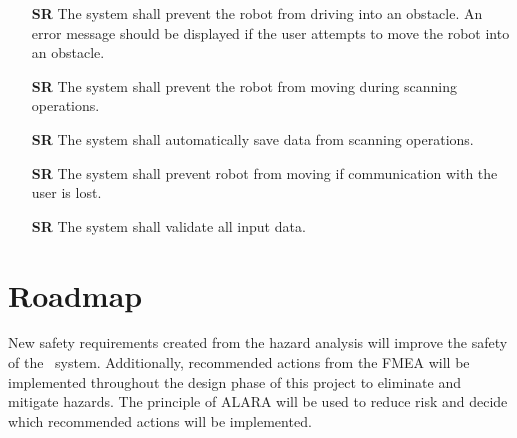 \documentclass[12pt]{article}
\newcounter{srnum} %
\begin{document}
\begin{itemize}

\item[\textbf{SR\refstepcounter{srnum}\thesrnum \label{SR1}}] The system shall prevent the robot from driving into an obstacle. An error message should be displayed if the user attempts to move the robot into an obstacle.

\item[\textbf{SR\refstepcounter{srnum}\thesrnum \label{SR2}}] The system shall prevent the robot from moving during scanning operations.

\item[\textbf{SR\refstepcounter{srnum}\thesrnum \label{SR3}}] The system shall automatically save data from scanning operations.

\item[\textbf{SR\refstepcounter{srnum}\thesrnum \label{SR4}}] The system shall prevent robot from moving if communication with the user is lost.

\item[\textbf{SR\refstepcounter{srnum}\thesrnum \label{SR5}}] The system shall validate all input data.

\end{itemize}

\section{Roadmap }

New safety requirements created from the hazard analysis will improve the safety of the \progname ~system. Additionally, recommended actions from the FMEA will be implemented throughout the design phase of this project to eliminate and mitigate hazards. The principle of ALARA will be used to reduce risk and decide which recommended actions will be implemented. 
\end{document}
